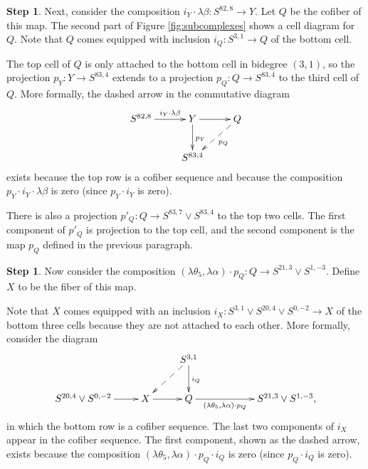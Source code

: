 \documentclass{amsart}
\theoremstyle{definition}
\newtheorem{step}[thm]{Step}
\newcommand{\map}{\rightarrow}
\newcommand{\Xtwofour}{Y}
\newcommand{\Xtwofive}{Q}
\begin{document}
\begin{step}
\label{step:X[2,5]}
Next, consider the composition 
$i_\Xtwofour \cdot \lambda \beta: S^{82,8} \map \Xtwofour$.
Let $\Xtwofive$ be the cofiber of this map.
The second part of Figure \ref{fig:subcomplexes} shows a cell diagram
for $\Xtwofive$.
Note that $\Xtwofive$ comes equipped with inclusion
$i_\Xtwofive: S^{3,1} \map \Xtwofive$ of the bottom cell.

The top cell of $\Xtwofive$ is only attached to the bottom cell in bidegree $(3,1)$,
so the projection $p_\Xtwofour: \Xtwofour \map S^{83, 4}$ 
extends to a projection $p_\Xtwofive:\Xtwofive \map S^{83, 4}$ to the 
third cell of $\Xtwofive$.
More formally,
the dashed arrow in the commutative diagram 
\[
\xymatrix{
S^{82, 8} \ar[r]^-{i_\Xtwofour \cdot \lambda \beta} & \Xtwofour \ar@{->}[d]^{p_\Xtwofour} \ar[r] & \Xtwofive \ar@{-->}[dl]^-{p_\Xtwofive}\\
 & S^{83, 4} &
}
\]
exists because the top row is a cofiber sequence and because
the composition $p_\Xtwofour \cdot i_\Xtwofour \cdot \lambda \beta$ is zero
(since $p_\Xtwofour \cdot i_\Xtwofour$ is zero).

There is also a projection
$p'_\Xtwofive: \Xtwofive \map S^{83, 7} \vee S^{83,4}$
to the top two cells.  The first component of $p'_\Xtwofive$
is projection to the top cell, and the second component is
the map $p_\Xtwofive$ defined in the previous paragraph.
\end{step}

\begin{step}
\label{step:X[0,5]}
Now consider the composition 
$(\lambda \theta_5, \lambda \alpha) \cdot p_\Xtwofive:
\Xtwofive \map S^{21, 3} \vee S^{1,-3}$.
Define $X$ to be the fiber of this map.

Note that $X$ comes equipped with an inclusion
$i_X: S^{3,1} \vee S^{20,4} \vee S^{0,-2} \map X$
of the bottom three cells because they are not attached to each other.
More formally, consider the diagram
\[
\xymatrix{
& & S^{3,1} \ar@{-->}[dl] \ar[d]^{i_\Xtwofive} \\
S^{20,4} \vee S^{0,-2} \ar[r] & X \ar[r] & \Xtwofive \ar[rr]_-{(\lambda \theta_5, \lambda \alpha) \cdot p_\Xtwofive} & & S^{21,3} \vee S^{1,-3},
}
\]
in which the bottom row is a cofiber sequence.
The last two components of $i_X$ appear in the cofiber
sequence.  The first component, shown as the dashed arrow, exists
because the composition
$(\lambda \theta_5, \lambda \alpha) \cdot p_\Xtwofive \cdot i_\Xtwofive$ is 
zero (since $p_\Xtwofive \cdot i_\Xtwofive$ is zero).
\end{step}
\end{document}
